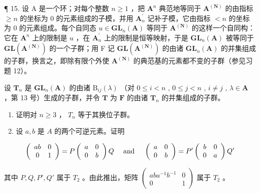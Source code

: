 ¶ 15. 设 A 是一个环；对每个整数 \(n \geqslant 1\) ，把 \(\mathbf{A}^{n}\) 典范地等同于 \(\mathbf{A}^{(\mathbf{N})}\) 的由指标 \(\geqslant n\) 的坐标为 0 的元素组成的子模，并用 \(\mathbf{A}_{n}^{\prime}\) 记补子模，它由指标 \(<n\) 的坐标为 0 的元素组成。每个自同态 \(u \in \mathbf{GL}_{n}(\mathbf{A})\) 等同于 \(\mathbf{A}^{(\mathbf{N})}\) 的这样一个自同构：它在 \(\mathbf{A}^{n}\) 上的限制是 \(u\) ，在 \(\mathbf{A}_{n}^{\prime}\) 上的限制是恒等映射，于是 \(\mathbf{GL}_{n}(\mathbf{A})\) 被等同于 \(\mathbf{GL}(\mathbf{A}^{(\mathbf{N})})\) 的一个子群；用 F 记 \(\mathbf{GL}(\mathbf{A}^{(\mathbf{N})})\) 的由诸 \(\mathbf{GL}_{n}(\mathbf{A})\) 的并集组成的子群，换言之，即除有限个外使 \(\mathbf{A}^{(\mathbf{N})}\) 的典范基的元素都不变的子群（参见习题 12）。

设 \(\mathbf{T}_n\) 是 \(\mathbf{GL}_n(\mathbf{A})\) 的由诸 \(\mathrm{B}_{ij}(\lambda)\) （对 \(0 \leqslant i < n\) , \(0 \leqslant j < n\) , \(i \neq j\) , \(\lambda \in \mathbf{A}\) ，第 13 号）生成的子群，并令 \(\mathbf{T}\) 为 \(\mathbf{F}\) 的由诸 \(\mathbf{T}_n\) 的并集组成的子群。

\begin{enumerate}
\def\labelenumi{(\alph{enumi})}
\item
  证明对 \(n \geqslant 3\) ， \(T_n\) 等于其换位子群。
\item
  设 \(a, b\) 是 \(A\) 的两个可逆元素。证明
\end{enumerate}

\[
\left( \begin{array}{c c} a b & 0 \\ 0 & 1 \end{array} \right) = P \left( \begin{array}{c c} a & 0 \\ 0 & b \end{array} \right) Q \quad \text { and } \quad \left( \begin{array}{c c} a & 0 \\ 0 & b \end{array} \right) = P ^ {\prime} \left( \begin{array}{c c} b & 0 \\ 0 & a \end{array} \right) Q ^ {\prime}
\]

其中 \(P, Q, P', Q'\) 属于 \(T_2\) 。由此推出，矩阵 \(\begin{pmatrix} aba^{-1}b^{-1} & 0 \\ 0 & 1\end{pmatrix}\) 属于 \(T_2\) 。

